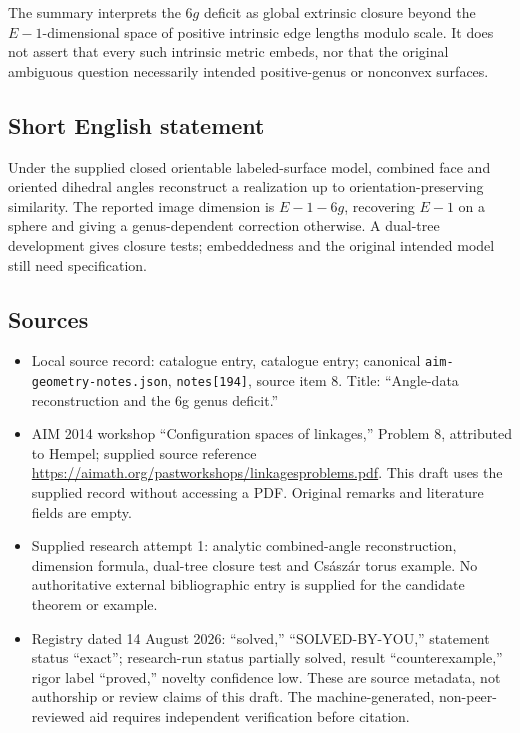 \documentclass[11pt]{article}
\begin{document}
The summary interprets the \(6g\) deficit as global extrinsic closure beyond the \(E-1\)-dimensional space of positive intrinsic edge lengths modulo scale. It does not assert that every such intrinsic metric embeds, nor that the original ambiguous question necessarily intended positive-genus or nonconvex surfaces.
\subsection{Short English statement}
Under the supplied closed orientable labeled-surface model, combined face and oriented dihedral angles reconstruct a realization up to orientation-preserving similarity. The reported image dimension is \(E-1-6g\), recovering \(E-1\) on a sphere and giving a genus-dependent correction otherwise. A dual-tree development gives closure tests; embeddedness and the original intended model still need specification.
\subsection{Sources}
\begin{itemize}
\item Local source record: catalogue entry, catalogue entry; canonical \texttt{aim-geometry-notes.json}, \texttt{notes[194]}, source item 8. Title: ``Angle-data reconstruction and the 6g genus deficit.''
\item AIM 2014 workshop ``Configuration spaces of linkages,'' Problem 8, attributed to Hempel; supplied source reference \url{https://aimath.org/pastworkshops/linkagesproblems.pdf}. This draft uses the supplied record without accessing a PDF. Original remarks and literature fields are empty.
\item Supplied research attempt 1: analytic combined-angle reconstruction, dimension formula, dual-tree closure test and Cs\'asz\'ar torus example. No authoritative external bibliographic entry is supplied for the candidate theorem or example.
\item Registry dated 14 August 2026: ``solved,'' ``SOLVED-BY-YOU,'' statement status ``exact''; research-run status partially solved, result ``counterexample,'' rigor label ``proved,'' novelty confidence low. These are source metadata, not authorship or review claims of this draft. The machine-generated, non-peer-reviewed aid requires independent verification before citation.
\end{itemize}
\end{document}

